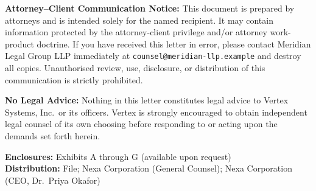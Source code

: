 \begin{tcolorbox}[
  enhanced,
  colback=NexaFrost,
  colframe=NexaLine,
  arc=2pt,
  left=10pt, right=10pt, top=8pt, bottom=8pt,
  boxrule=0.5pt,
]
  {\footnotesize\color{NexaSlate}
    \textbf{Attorney--Client Communication Notice:}
    This document is prepared by attorneys and is intended solely for the
    named recipient. It may contain information protected by the attorney-client
    privilege and/or attorney work-product doctrine. If you have received this
    letter in error, please contact Meridian Legal Group LLP immediately at
    \texttt{counsel@meridian-llp.example} and destroy all copies. Unauthorised
    review, use, disclosure, or distribution of this communication is strictly
    prohibited.

    \vspace{4pt}
    \textbf{No Legal Advice:}
    Nothing in this letter constitutes legal advice to Vertex Systems, Inc.\ or
    its officers. Vertex is strongly encouraged to obtain independent legal
    counsel of its own choosing before responding to or acting upon the
    demands set forth herein.
  }
\end{tcolorbox}

\vspace{8pt}

\noindent
{\footnotesize\color{NexaSlate}
  \textbf{Enclosures:} Exhibits A through G (available upon request)\\
  \textbf{Distribution:} File; Nexa Corporation (General Counsel);
  Nexa Corporation (CEO, Dr.~Priya Okafor)
}
